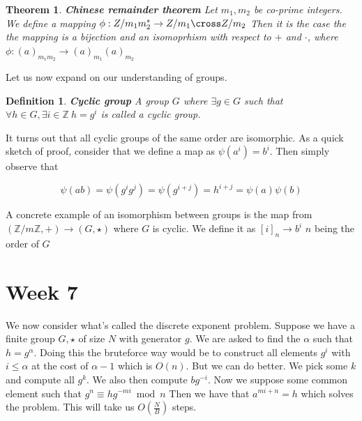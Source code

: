 \documentclass[titlepage]{article}
\newtheorem{theorem}{Theorem}[section]
\newtheorem{definition}{Definition}
\begin{document}
\begin{theorem}\textbf{Chinese remainder theorem}
Let $m_{1},m_{2}$ be co-prime integers. We define a mapping $\phi: Z/m_{1}m_{2}^{*} \to  Z/m_{1} \cross Z/m_{2} $ Then it is the case the the mapping is a bijection and an isomoprhism with respect to $+$ and $\cdot$, where $\phi:(a)_{m_{1}m_{2}} \to (a)_{m_{1}}(a)_{m_{2}}$
\end{theorem}

Let us now expand on our understanding of groups. 

\begin{definition}\textbf{Cyclic group}
A group $G$ where $\exists g \in G$ such that $\forall h \in G, \exists i \in \mathbb{Z} \ h = g^{i}$ is called a cyclic group. 
\end{definition}

It turns out that all cyclic groups of the same order are isomorphic. As a quick sketch of proof, consider that we define a map as $\psi(a^{i})=b^{i}$. Then simply observe that 

$$\psi(ab) = \psi(g^{i}g^{j}) = \psi(g^{i+j})=h^{i+j}=\psi(a)\psi(b)$$

A concrete example of an isomorphism between groups is the map from $(\mathbb{Z}/m\mathbb{Z},+) \to (G,\star)$ where $G$ is cyclic. We define it as $[i]_{n} \to b^{i}$ $n$ being the order of $G$


\section{Week 7}
We now consider what's called the discrete exponent problem. Suppose we have a finite group $G,\star$ of size $N$ with generator $g$. We are asked to find the $\alpha$ such that $h = g^{\alpha}$. Doing this the bruteforce way would be to construct all elements $g^{i}$ with $i\leq \alpha$ at the cost of $\alpha - 1$ which is $O(n)$. But we can do better. We pick some $k$ and compute all $g^{k}$. We also then compute $bg^{-i}$. Now we suppose some common element such that $g^{n} \equiv hg^{-mi} \bmod{n}$ Then we have that $a^{mi+n} = h$ which solves the problem. This will take us $O(\frac{N}{B})$ steps.
\\
\end{document}
